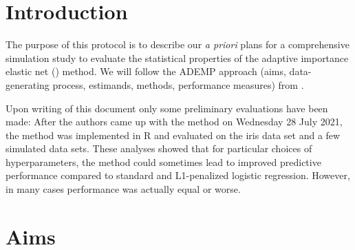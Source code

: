 \documentclass[a4paper, 11pt]{article}\usepackage[]{graphicx}\usepackage[]{color}
\title{
  \vspace{-2em}
  \textbf{\longtitle} \\
  \subtitle
}
\author{
  \textbf{\longauthors}
}
\date{\today} %
\begin{document}
\maketitle




\section{Introduction}
\label{sec:introduction}
The purpose of this protocol is to describe our \emph{a priori} plans for a
comprehensive simulation study to evaluate the statistical properties of the
adaptive importance elastic net (\ainet) method. We will follow the ADEMP
approach (aims, data-generating process, estimands, methods, performance
measures) from \citet{Morris2019}.

Upon writing of this document only some preliminary evaluations have been made:
After the authors came up with the method on Wednesday 28 July 2021, the method
was implemented in \textsf{R} and evaluated on the iris data set and a few 
simulated data sets.
These analyses showed that for particular choices of hyperparameters, the
method could sometimes lead to improved predictive performance compared to
standard and L1-penalized logistic regression. However, in many cases
performance was actually equal or worse.

\section{Aims} \label{sec:aims}
\end{document}
